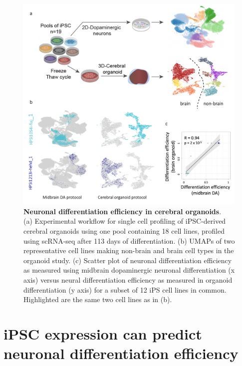 \begin{figure}[htbp]
\centering
\includegraphics[width=14cm]{Chapter5/Fig/neuroseq_organoids.png}
\caption[Neuronal differentiation efficiency in cerebral organoids]{\textbf{Neuronal differentiation efficiency in cerebral organoids}.\\
(a) Experimental workflow for single cell profiling of iPSC-derived cerebral organoids using one pool containing 18 cell lines, profiled using scRNA-seq after 113 days of differentiation.
(b) UMAPs of two representative cell lines making non-brain and brain cell types in the organoid study. 
(c) Scatter plot of neuronal differentiation efficiency as measured using midbrain dopaminergic neuronal differentiation (x axis) versus neural differentiation efficiency as measured in organoid differentiation (y axis) for a subset of 12 iPS cell lines in common. 
Highlighted are the same two cell lines as in (b).}
\label{fig:neuroseq_organoids}
\end{figure}


\clearpage

\section{iPSC expression can predict neuronal differentiation efficiency}
\label{sec:neuroseq_ips}

